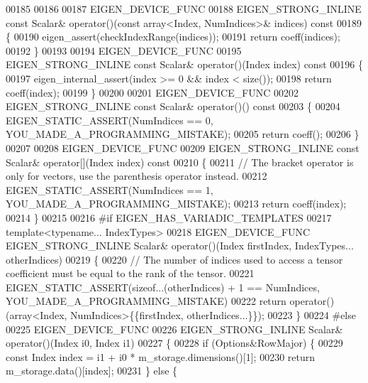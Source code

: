 \begin{DoxyCode}
00185 
00186 
00187     EIGEN\_DEVICE\_FUNC
00188     EIGEN\_STRONG\_INLINE \textcolor{keyword}{const} Scalar& operator()(\textcolor{keyword}{const} array<Index, NumIndices>& indices)\textcolor{keyword}{ const}
00189 \textcolor{keyword}{    }\{
00190       eigen\_assert(checkIndexRange(indices));
00191       \textcolor{keywordflow}{return} coeff(indices);
00192     \}
00193 
00194     EIGEN\_DEVICE\_FUNC
00195     EIGEN\_STRONG\_INLINE \textcolor{keyword}{const} Scalar& operator()(Index index)\textcolor{keyword}{ const}
00196 \textcolor{keyword}{    }\{
00197       eigen\_internal\_assert(index >= 0 && index < size());
00198       \textcolor{keywordflow}{return} coeff(index);
00199     \}
00200 
00201     EIGEN\_DEVICE\_FUNC
00202     EIGEN\_STRONG\_INLINE \textcolor{keyword}{const} Scalar& operator()()\textcolor{keyword}{ const}
00203 \textcolor{keyword}{    }\{
00204       EIGEN\_STATIC\_ASSERT(NumIndices == 0, YOU\_MADE\_A\_PROGRAMMING\_MISTAKE);
00205       \textcolor{keywordflow}{return} coeff();
00206     \}
00207 
00208     EIGEN\_DEVICE\_FUNC
00209     EIGEN\_STRONG\_INLINE \textcolor{keyword}{const} Scalar& operator[](Index index)\textcolor{keyword}{ const}
00210 \textcolor{keyword}{    }\{
00211       \textcolor{comment}{// The bracket operator is only for vectors, use the parenthesis operator instead.}
00212       EIGEN\_STATIC\_ASSERT(NumIndices == 1, YOU\_MADE\_A\_PROGRAMMING\_MISTAKE);
00213       \textcolor{keywordflow}{return} coeff(index);
00214     \}
00215 
00216 \textcolor{preprocessor}{#if EIGEN\_HAS\_VARIADIC\_TEMPLATES}
00217     \textcolor{keyword}{template}<\textcolor{keyword}{typename}... IndexTypes>
00218     EIGEN\_DEVICE\_FUNC EIGEN\_STRONG\_INLINE Scalar& operator()(Index firstIndex, IndexTypes... otherIndices)
00219     \{
00220       \textcolor{comment}{// The number of indices used to access a tensor coefficient must be equal to the rank of the tensor.}
00221       EIGEN\_STATIC\_ASSERT(\textcolor{keyword}{sizeof}...(otherIndices) + 1 == NumIndices, YOU\_MADE\_A\_PROGRAMMING\_MISTAKE)
00222       \textcolor{keywordflow}{return} operator()(array<Index, NumIndices>\{\{firstIndex, otherIndices...\}\});
00223     \}
00224 \textcolor{preprocessor}{#else}
00225     EIGEN\_DEVICE\_FUNC
00226     EIGEN\_STRONG\_INLINE Scalar& operator()(Index i0, Index i1)
00227     \{
00228        \textcolor{keywordflow}{if} (Options&RowMajor) \{
00229          \textcolor{keyword}{const} Index index = i1 + i0 * m\_storage.dimensions()[1];
00230         \textcolor{keywordflow}{return} m\_storage.data()[index];
00231       \} \textcolor{keywordflow}{else} \{

\end{DoxyCode}
